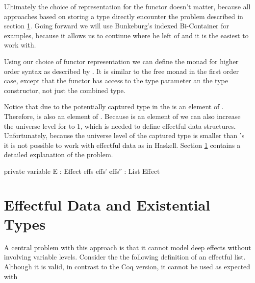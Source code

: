 Ultimately the choice of representation for the functor doesn't matter, because
all approaches based on storing a type directly encounter the problem described
in section \ref{higher-order:eff-data-ext-types}.
Going forward we will use Bunkeburg's indexed Bi-Container for examples, because
it allows us to continue where he left of and it is the easiest to work with.
 
Using our choice of functor representation we can define the 
monad for higher order syntax as described by
\textcite{DBLP:conf/haskell/WuSH14}.
It is similar to the free monad in the first order case, except that the functor
has access to the type parameter an the type constructor, not just the
combined type.

Notice that due to the potentially captured type in the  is an
element of .
Therefore,  is also an element of .
Because  is an element of  we can also
increase the universe level for  to $1$, which is needed to
define effectful data structures.
Unfortunately, because the universe level of the captured type is smaller than
's it is not possible to work with effectful data as in
Haskell.
Section \ref{higher-order:eff-data-ext-types} contains a detailed explanation of
the problem.

\begin{code}[hide]
private
  variable
    E : Effect
    effs effs′ effs″ : List Effect
\end{code}

\section{Effectful Data and Existential Types}
\label{higher-order:eff-data-ext-types}

A central problem with this approach is that it cannot model deep effects
without involving variable levels.
Consider the the following definition of an effectful list.
Although it is valid, in contrast to the Coq version, it cannot be used as
expected with 

